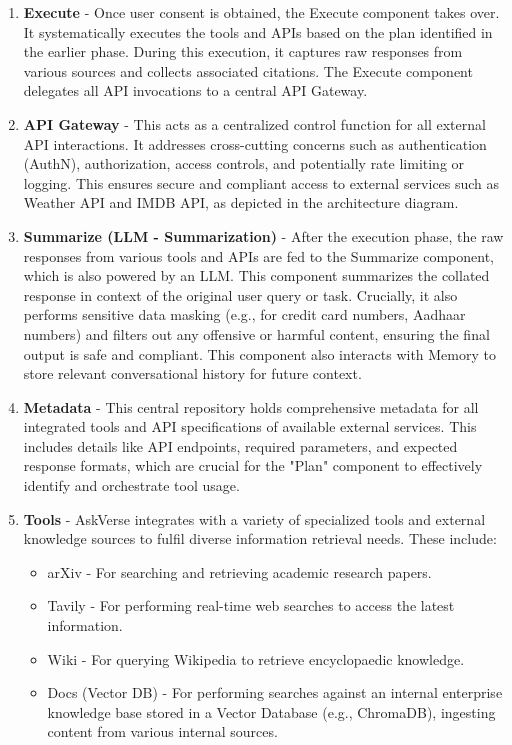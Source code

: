 \documentclass[default]{sn-jnl}%
\begin{document}
\begin{enumerate}
    \item \textbf{Execute} - Once user consent is obtained, the Execute component takes over. It systematically executes the tools and APIs based on the plan identified in the earlier phase. During this execution, it captures raw responses from various sources and collects associated citations. The Execute component delegates all API invocations to a central API Gateway.
    \item \textbf{API Gateway} - This acts as a centralized control function for all external API interactions. It addresses cross-cutting concerns such as authentication (AuthN), authorization, access controls, and potentially rate limiting or logging. This ensures secure and compliant access to external services such as Weather API and IMDB API, as depicted in the architecture diagram.
    \item \textbf{Summarize (LLM - Summarization)} - After the execution phase, the raw responses from various tools and APIs are fed to the Summarize component, which is also powered by an LLM. This component summarizes the collated response in context of the original user query or task. Crucially, it also performs sensitive data masking (e.g., for credit card numbers, Aadhaar numbers) and filters out any offensive or harmful content, ensuring the final output is safe and compliant. This component also interacts with Memory to store relevant conversational history for future context.
    \item \textbf{Metadata} - This central repository holds comprehensive metadata for all integrated tools and API specifications of available external services. This includes details like API endpoints, required parameters, and expected response formats, which are crucial for the "Plan" component to effectively identify and orchestrate tool usage.
    \item \textbf{Tools} - AskVerse integrates with a variety of specialized tools and external knowledge sources to fulfil diverse information retrieval needs. These include:
    \begin{itemize}
        \item arXiv - For searching and retrieving academic research papers.
        \item Tavily - For performing real-time web searches to access the latest information.
        \item Wiki - For querying Wikipedia to retrieve encyclopaedic knowledge.
        \item Docs (Vector DB) - For performing searches against an internal enterprise knowledge base stored in a Vector Database (e.g., ChromaDB), ingesting content from various internal sources.

\end{itemize}
\end{enumerate}
\end{document}

